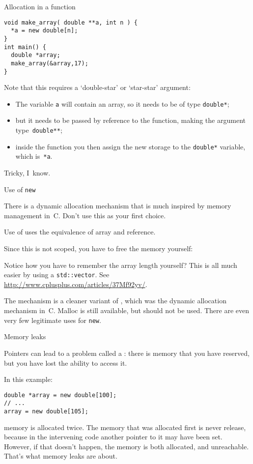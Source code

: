 \begin{block}{Allocation in a function}
\begin{lstlisting}
void make_array( double **a, int n ) {
  *a = new double[n];
}
int main() {
  double *array;
  make_array(&array,17);
}
\end{lstlisting}
\end{block}

Note that this requires a `double-star' or `star-star' argument:
\begin{itemize}
\item The variable \lstinline{a} will contain an array, so it needs to be of
  type \lstinline{double*};
\item but it needs to be passed by reference to the function, making
  the argument type~\lstinline{double**};
\item inside the function you then assign the new storage to the
  \lstinline{double*} variable, which is~\lstinline{*a}.
\end{itemize}
Tricky, I~know.

 {Use of \texttt{new}}
\label{sec:cnew}


There is a dynamic allocation mechanism that is much inspired by
memory management in~C. Don't use this as your first choice.

Use of  uses the 
equivalence of array and reference.
%

Since this is not scoped, you have to free the memory yourself:
%

Notice how you have to remember the array length yourself? This is all
much easier by using a \lstinline{std::vector}. See
\url{http://www.cplusplus.com/articles/37Mf92yv/}.

The  mechanism is a cleaner variant of ,
which was the dynamic allocation mechanism in~C. Malloc is still
available, but should not be used. There are even very few legitimate
uses for \lstinline{new}.


 {Memory leaks}
\label{sec:memleak}

Pointers can lead to a problem called a :
there is memory that you have reserved, but you have lost the ability
to access it.

In this example:
\begin{lstlisting}
double *array = new double[100];
// ...
array = new double[105];
\end{lstlisting}
memory is allocated twice. The memory that was allocated first is
never release, because in the intervening code another pointer to it
may have been set. However, if that doesn't happen, the memory is both
allocated, and unreachable. That's what memory leaks are about.

